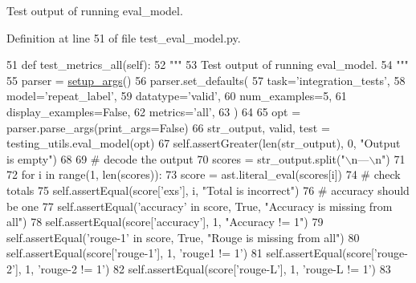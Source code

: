 \begin{DoxyVerb}Test output of running eval_model.
\end{DoxyVerb}
 

Definition at line 51 of file test\+\_\+eval\+\_\+model.\+py.


\begin{DoxyCode}
51     \textcolor{keyword}{def }test\_metrics\_all(self):
52         \textcolor{stringliteral}{"""}
53 \textcolor{stringliteral}{        Test output of running eval\_model.}
54 \textcolor{stringliteral}{        """}
55         parser = \hyperlink{namespaceparlai_1_1chat__service_1_1services_1_1messenger_1_1run_a17bafea2534d593de1fbf1e0724e5b67}{setup\_args}()
56         parser.set\_defaults(
57             task=\textcolor{stringliteral}{'integration\_tests'},
58             model=\textcolor{stringliteral}{'repeat\_label'},
59             datatype=\textcolor{stringliteral}{'valid'},
60             num\_examples=5,
61             display\_examples=\textcolor{keyword}{False},
62             metrics=\textcolor{stringliteral}{'all'},
63         )
64 
65         opt = parser.parse\_args(print\_args=\textcolor{keyword}{False})
66         str\_output, valid, test = testing\_utils.eval\_model(opt)
67         self.assertGreater(len(str\_output), 0, \textcolor{stringliteral}{"Output is empty"})
68 
69         \textcolor{comment}{# decode the output}
70         scores = str\_output.split(\textcolor{stringliteral}{"\(\backslash\)n---\(\backslash\)n"})
71 
72         \textcolor{keywordflow}{for} i \textcolor{keywordflow}{in} range(1, len(scores)):
73             score = ast.literal\_eval(scores[i])
74             \textcolor{comment}{# check totals}
75             self.assertEqual(score[\textcolor{stringliteral}{'exs'}], i, \textcolor{stringliteral}{"Total is incorrect"})
76             \textcolor{comment}{# accuracy should be one}
77             self.assertEqual(\textcolor{stringliteral}{'accuracy'} \textcolor{keywordflow}{in} score, \textcolor{keyword}{True}, \textcolor{stringliteral}{"Accuracy is missing from all"})
78             self.assertEqual(score[\textcolor{stringliteral}{'accuracy'}], 1, \textcolor{stringliteral}{"Accuracy != 1"})
79             self.assertEqual(\textcolor{stringliteral}{'rouge-1'} \textcolor{keywordflow}{in} score, \textcolor{keyword}{True}, \textcolor{stringliteral}{"Rouge is missing from all"})
80             self.assertEqual(score[\textcolor{stringliteral}{'rouge-1'}], 1, \textcolor{stringliteral}{'rouge1 != 1'})
81             self.assertEqual(score[\textcolor{stringliteral}{'rouge-2'}], 1, \textcolor{stringliteral}{'rouge-2 != 1'})
82             self.assertEqual(score[\textcolor{stringliteral}{'rouge-L'}], 1, \textcolor{stringliteral}{'rouge-L != 1'})
83 
\end{DoxyCode}
\mbox{\label{classtests_1_1test__eval__model_1_1TestEvalModel_a7b7b27f681704f217f711b04311977c2}} 
